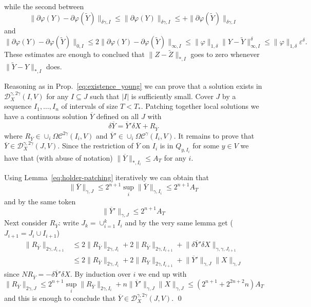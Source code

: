 \documentclass[a4paper,12pt,reqno]{amsproc}
\newcommand{\der}{\delta\!}
\newcommand{\NN}{N}
\newcommand{\DD}{\mathcal{D}}
\newcommand{\OCC}{\Omega \mathcal{C}}
\newcommand{\norm}[1]{\lVert #1\rVert}
\newcommand{\wt}{\widetilde}
\begin{document}
while the second between
$$
\norm{\partial
    \varphi(Y) - \partial \varphi(\wt Y)}_{\delta\gamma,I} \le 
\norm{\partial
    \varphi(Y) }_{\delta\gamma,I} \le 
+\norm{\partial
    \varphi(\wt Y) }_{\delta\gamma,I} 
$$
and
$$
\norm{\partial
    \varphi(Y) - \partial \varphi(\wt Y)}_{0,I} \le 2
\norm{\partial
    \varphi(Y) - \partial \varphi(\wt Y)}_{\infty,I}
\le \norm{\varphi}_{1,\delta} \norm{Y-\wt Y}^\delta_{\infty,I} \le
\norm{\varphi}_{1,\delta} \varepsilon^{\delta}.
$$
These estimates are enough to conclued that $\norm{Z-\wt Z}_{*,I}$ goes to zero whenever
$\norm{\wt Y - Y}_{*,I}$ does.

Reasoning as in Prop.~\ref{eq:existence_young}
we can prove that a solution exists in $\DD_X^{\gamma,2\gamma}(I,V)$
for any $I \subseteq J$ such that $|I|$ is sufficiently small.
Cover $J$ by a sequence $I_1,\dots,I_n$ of intervals of size $T <
T_*$.
 Patching
together local solutions we have a continuous solution $\overline Y$ defined on
all $J$ with
$$
\der \overline Y = \overline Y' \der X + R_{\overline Y}
$$
where $R_{\overline Y} \in \cup_i \OCC^{2\gamma}(I_i,V)$ and $\overline Y' \in \cup_i \OCC^{\gamma}(I_i,V)$. 
 It remains to prove that $\overline Y \in
\DD_X^{\gamma,2\gamma}(J,V)$. 
 Since the
restriction of $\overline Y$ on $I_i$ is in $Q_{y,I_i}$ for some $y
\in V$  we have that (with abuse of notation)
$\norm{\overline Y}_{*,I_i} \le A_T$ for any $i$.

 Using
Lemma~\ref{eq:holder-patching} iteratively we can obtain that
$$
\norm{\overline Y}_{\gamma,J} \le 2^{n+1} \sup_i \norm{\overline
  Y}_{\gamma,I_i} \le 2^{n+1} A_T
$$
and by the same token
$$
\norm{\overline Y'}_{\gamma,J} \le 2^{n+1} A_T
$$
Next consider $R_{\overline Y}$: write $J_k = \cup_{i=1}^k I_i$ and by
the very same lemma  get ($J_{i+1} = J_i \cup I_{i+1}$)
\begin{equation*}
  \begin{split}
\norm{R_{\overline Y}}_{2\gamma,J_{i+1}} & \le 2
\norm{R_{\overline Y}}_{2\gamma,J_i} + 2\norm{R_{\overline
    Y}}_{2\gamma,I_{i+1}}    + \norm{\der \overline Y'\der
  X}_{\gamma,\gamma,J_{i+1}}    
\\ & \le  2
\norm{R_{\overline Y}}_{2\gamma,J_i} + 2\norm{R_{\overline
    Y}}_{2\gamma,I_{i+1}}    + \norm{\overline Y'}_{\gamma,J} \norm{X}_{\gamma,J}   \end{split}
\end{equation*}
since $\NN R_{\overline Y} = - \der \overline Y'\der X$. By induction
over $i$ we end up with
\begin{equation*}
  \norm{R_{\overline Y}}_{2\gamma,J} \le 2^{n+1} \sup_i \norm{R_{\overline
    Y}}_{2\gamma,I_{i}} + n \norm{\overline Y'}_{\gamma,J}
    \norm{X}_{\gamma,J} 
\le (2^{n+1}+ 2^{2n+2} n) A_T
\end{equation*}
and this is enough to conclude that $\overline Y \in \DD_X^{\gamma,2\gamma}(J,V)$.
\qed
\end{document}
